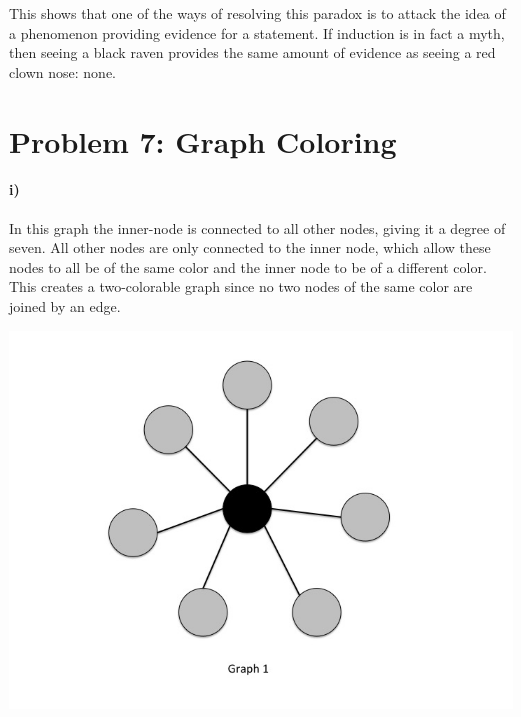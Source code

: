 \documentclass[10pt,letter]{article}
\begin{document}
This shows that one of the ways of resolving this paradox is to attack the idea of a phenomenon providing evidence for a statement. If induction is in fact a myth, then seeing a black raven provides the same amount of evidence as seeing a red clown nose: none. 

\section*{Problem 7: Graph Coloring}

\paragraph{i)}
In this graph the inner-node is connected to all other nodes, giving it a degree of seven. All other nodes are only connected to the inner node, which allow these nodes to all be of the same color and the inner node to be of a different color. This creates a two-colorable graph since no two nodes of the same color are joined by an edge. \\
\begin{minipage}{.8\textwidth}
\includegraphics[width=.8\linewidth]{hw3_slide1.jpg}
\end{minipage}
\end{document}
